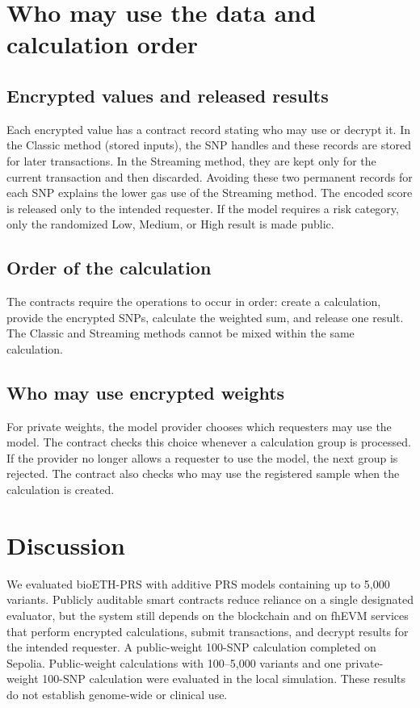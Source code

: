 \documentclass[10pt]{article}
\begin{document}
\section{Who may use the data and calculation order}
\label{sec:data_use}

\subsection{Encrypted values and released results}

Each encrypted value has a contract record stating who may use or decrypt it.  In the
Classic method (stored inputs), the SNP handles and these records are stored for later
transactions.  In the Streaming method, they are kept only for the current transaction
and then discarded.  Avoiding these two permanent records for each SNP explains the
lower gas use of the Streaming method.  The encoded score is released only to the
intended requester.  If the model requires a risk category, only the randomized Low,
Medium, or High result is made public.

\subsection{Order of the calculation}

The contracts require the operations to occur in order: create a calculation, provide
the encrypted SNPs, calculate the weighted sum, and release one result.  The Classic and
Streaming methods cannot be mixed within the same calculation.

\subsection{Who may use encrypted weights}

For private weights, the model provider chooses which requesters may use the model.  The
contract checks this choice whenever a calculation group is processed.  If the provider
no longer allows a requester to use the model, the next group is rejected.  The contract
also checks who may use the registered sample when the calculation is created.

\section{Discussion}
\label{sec:discussion}

We evaluated bioETH-PRS with additive PRS models containing up to 5,000 variants.  Publicly
auditable smart contracts reduce reliance on a single designated evaluator, but
the system still depends on the blockchain and on fhEVM services that perform encrypted
calculations, submit transactions, and decrypt results for the intended requester.  A public-weight 100-SNP
calculation completed on Sepolia.  Public-weight calculations with 100--5,000 variants
and one private-weight 100-SNP calculation were evaluated in the local simulation.
These results do not establish genome-wide or clinical use.
\end{document}
